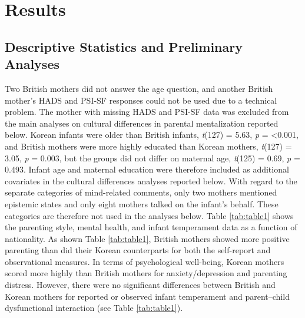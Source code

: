 \documentclass[
]{article}
\begin{document}
\hypertarget{results}{%
\section*{Results}\label{results}}

\hypertarget{descriptive-statistics-and-preliminary-analyses}{%
\subsection*{Descriptive Statistics and Preliminary Analyses}\label{descriptive-statistics-and-preliminary-analyses}}

Two British mothers did not answer the age question, and another British mother's HADS and PSI-SF responses could not be used due to a technical problem. The mother with missing HADS and PSI-SF data was excluded from the main analyses on cultural differences in parental mentalization reported below.
Korean infants were older than British infants, \emph{t}(127) = 5.63, \emph{p} = \textless0.001,
and British mothers were more highly educated than Korean mothers, \emph{t}(127) = 3.05, \emph{p} = 0.003,
but the groups did not differ on maternal age, \emph{t}(125) = 0.69, \emph{p} = 0.493.
Infant age and maternal education were therefore included as additional covariates in the cultural differences analyses reported below. With regard to the separate categories of mind-related comments, only two mothers mentioned epistemic states and only eight mothers talked on the infant's behalf. These categories are therefore not used in the analyses below. Table \ref{tab:table1} shows the parenting style, mental health, and infant temperament data as a function of nationality. As shown Table \ref{tab:table1}, British mothers showed more positive parenting than did their Korean counterparts for both the self-report and observational measures. In terms of psychological well-being, Korean mothers scored more highly than British mothers for anxiety/depression and parenting distress. However, there were no significant differences between British and Korean mothers for reported or observed infant temperament and parent--child dysfunctional interaction (see Table \ref{tab:table1}).
\end{document}
